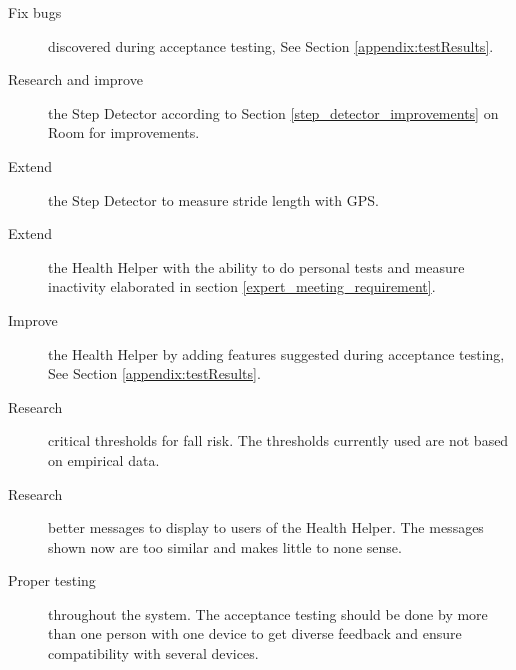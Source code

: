 \begin{description}
\item[Fix bugs] discovered during acceptance testing, See Section \ref{appendix:testResults}.
\item[Research and improve] the Step Detector according to Section \ref{step_detector_improvements} on Room for improvements. 
\item[Extend] the Step Detector to measure stride length with GPS.
\item[Extend] the Health Helper with the ability to do personal tests and measure inactivity elaborated in section \ref{expert_meeting_requirement}.
\item[Improve] the Health Helper by adding features suggested during acceptance testing, See Section \ref{appendix:testResults}.
\item[Research] critical thresholds for fall risk. The thresholds currently used are not based on empirical data.
\item[Research] better messages to display to users of the Health Helper. The messages shown now are too similar and makes little to none sense.
\item[Proper testing] throughout the system. The acceptance testing should be done by more than one person with one device to get diverse feedback and ensure compatibility with several devices.
\end{description}
